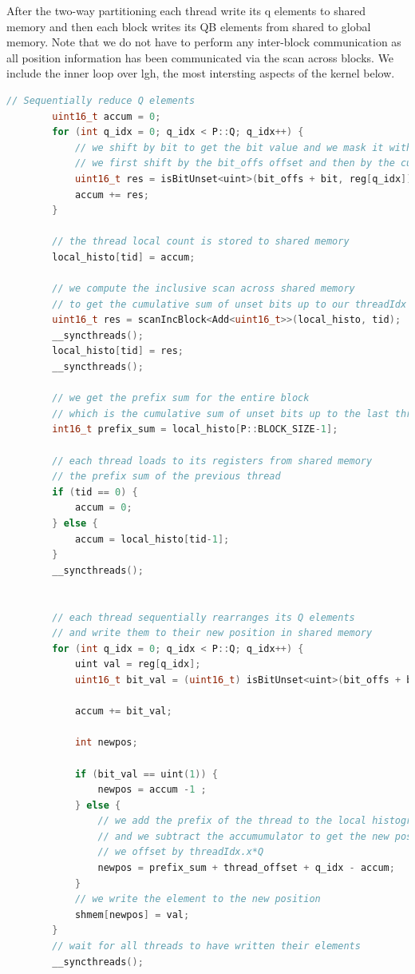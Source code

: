 \documentclass{article}
\begin{document}
After the two-way partitioning each thread write its q elements to shared memory and then each block writes its QB elements from shared to global memory. 
Note that we do not have to perform any inter-block communication as all position information has been communicated via the scan across blocks.
We include the inner loop over lgh, the most intersting aspects of the kernel below.
\newpage

\begin{lstlisting}[language=c++]
  // Sequentially reduce Q elements
        uint16_t accum = 0;
        for (int q_idx = 0; q_idx < P::Q; q_idx++) {
            // we shift by bit to get the bit value and we mask it with 1 to get the boolean value
            // we first shift by the bit_offs offset and then by the current bit from 0 to lgH-1
            uint16_t res = isBitUnset<uint>(bit_offs + bit, reg[q_idx]);
            accum += res;
        }
        
        // the thread local count is stored to shared memory
        local_histo[tid] = accum;

        // we compute the inclusive scan across shared memory
        // to get the cumulative sum of unset bits up to our threadIdx
        uint16_t res = scanIncBlock<Add<uint16_t>>(local_histo, tid);
        __syncthreads();
        local_histo[tid] = res;
        __syncthreads();

        // we get the prefix sum for the entire block
        // which is the cumulative sum of unset bits up to the last thread in the block
        int16_t prefix_sum = local_histo[P::BLOCK_SIZE-1];

        // each thread loads to its registers from shared memory
        // the prefix sum of the previous thread
        if (tid == 0) {
            accum = 0; 
        } else {
            accum = local_histo[tid-1];
        }
        __syncthreads();


        // each thread sequentially rearranges its Q elements
        // and write them to their new position in shared memory
        for (int q_idx = 0; q_idx < P::Q; q_idx++) {
            uint val = reg[q_idx];
            uint16_t bit_val = (uint16_t) isBitUnset<uint>(bit_offs + bit, val);
            
            accum += bit_val;

            int newpos;

            if (bit_val == uint(1)) {
                newpos = accum -1 ;
            } else {
                // we add the prefix of the thread to the local histogram position
                // and we subtract the accumumulator to get the new position
                // we offset by threadIdx.x*Q 
                newpos = prefix_sum + thread_offset + q_idx - accum;
            }
            // we write the element to the new position
            shmem[newpos] = val;
        }
        // wait for all threads to have written their elements
        __syncthreads();



\end{lstlisting}
\end{document}
